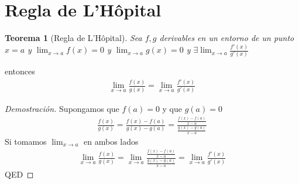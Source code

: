 \documentclass{article}
\newtheorem{lhopital}{Teorema}
\begin{document}
\section{Regla de L'Hôpital}
\begin{lhopital}[Regla de L'Hôpital]
    Sea $f,g$ derivables en un entorno de un punto $x=a$ y $\lim_{x \to a}f(x)=0$ y
    $\lim_{x \to a}g(x)=0$ y $\exists \lim_{x \to a} \frac{f'(x)}{g'(x)}$
\end{lhopital}
entonces
\begin{equation}
    \begin{split}
        \lim_{x \to a} \frac{f(x)}{g(x)}= \lim_{x \to a} \frac{f'(x)}{g'(x)}
    \end{split}
\end{equation}
\begin{proof}[Demostración]
    Supongamos que $f(a)=0$ y que $g(a)=0$
    \begin{equation}
        \begin{split}
            \frac{f(x)}{g(x)} = \frac{f(x)-f(a)}{g(x)-g(a)} = \frac{\frac{f(x)-f(a)}{x-a}}{\frac{g(x)-g(a)}{x-a}}
        \end{split}
    \end{equation}
    Si tomamos $\lim_{x \to a}$ en ambos lados
    \begin{equation}
        \begin{split}
            \lim_{x \to a} \frac{f(x)}{g(x)} = \lim_{x \to a} \frac{\frac{f(x)-f(a)}{x-a}}{\frac{g(x)-g(a)}{x-a}}
            = \lim_{x \to a} \frac{f'(x)}{g'(x)}
        \end{split}
    \end{equation}
    QED
\end{proof}
\end{document}
